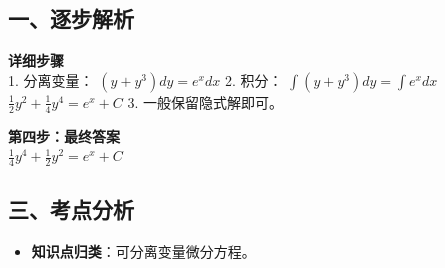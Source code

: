 \documentclass[12pt, a4paper]{ctexart}
\newenvironment{RedAnalysis}{
    \par
    \color{red} %
}{
    \par
    \color{black} %
}
\begin{document}
\begin{RedAnalysis}

\subsection*{一、逐步解析}

\textbf{详细步骤} \\
1. 分离变量：
   $(y + y^3) dy = e^x dx$
2. 积分：
   $\int (y + y^3) dy = \int e^x dx$
   $\frac{1}{2}y^2 + \frac{1}{4}y^4 = e^x + C$
3. 一般保留隐式解即可。

\textbf{第四步：最终答案} \\
$ \frac{1}{4}y^4 + \frac{1}{2}y^2 = e^x + C $

\subsection*{三、考点分析}
\begin{itemize}
    \item \textbf{知识点归类}：可分离变量微分方程。
\end{itemize}

\end{RedAnalysis}
\end{document}

